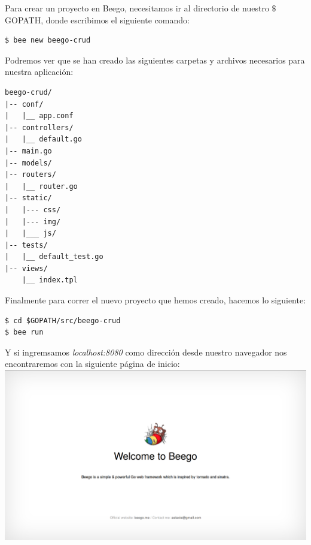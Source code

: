 \documentclass[12pt]{article}
\begin{document}
\noindent Para crear un proyecto en Beego, necesitamos ir al directorio de nuestro $\$$GOPATH, donde escribimos el siguiente comando:
\begin{verbatim}
$ bee new beego-crud
\end{verbatim}
\noindent Podremos ver que se han creado las siguientes carpetas y archivos necesarios para nuestra aplicación:

\begin{verbatim}
beego-crud/
|-- conf/
|   |__ app.conf
|-- controllers/
|   |__ default.go
|-- main.go
|-- models/
|-- routers/
|   |__ router.go
|-- static/
|   |--- css/
|   |--- img/
|   |___ js/
|-- tests/
|   |__ default_test.go
|-- views/
    |__ index.tpl
\end{verbatim}

\noindent Finalmente para correr el nuevo proyecto que hemos creado,  hacemos lo siguiente:
\begin{verbatim}
$ cd $GOPATH/src/beego-crud
$ bee run
\end{verbatim}
\noindent Y si ingremsamos \textit{localhost:8080} como dirección desde nuestro navegador nos encontraremos con la siguiente página de inicio: \\

\includegraphics[scale=0.25]{beego.png}
\end{document}
